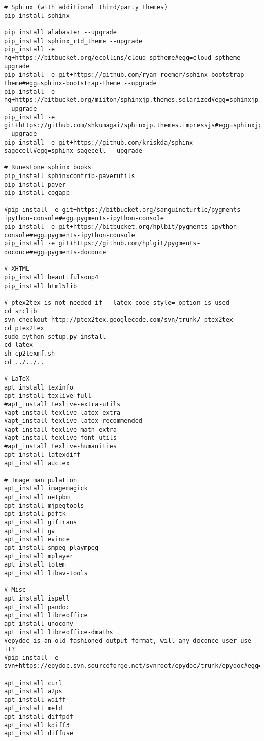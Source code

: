 \documentclass[%
oneside,                 %
final,                   %
chapterprefix=true,      %
open=right,              %
10pt]{book}
\begin{document}
\begin{verbatim}
# Sphinx (with additional third/party themes)
pip_install sphinx

pip_install alabaster --upgrade
pip_install sphinx_rtd_theme --upgrade
pip_install -e hg+https://bitbucket.org/ecollins/cloud_sptheme#egg=cloud_sptheme --upgrade
pip_install -e git+https://github.com/ryan-roemer/sphinx-bootstrap-theme#egg=sphinx-bootstrap-theme --upgrade
pip_install -e hg+https://bitbucket.org/miiton/sphinxjp.themes.solarized#egg=sphinxjp.themes.solarized --upgrade
pip_install -e git+https://github.com/shkumagai/sphinxjp.themes.impressjs#egg=sphinxjp.themes.impressjs --upgrade
pip_install -e git+https://github.com/kriskda/sphinx-sagecell#egg=sphinx-sagecell --upgrade

# Runestone sphinx books
pip_install sphinxcontrib-paverutils
pip_install paver
pip_install cogapp

#pip install -e git+https://bitbucket.org/sanguineturtle/pygments-ipython-console#egg=pygments-ipython-console
pip_install -e git+https://bitbucket.org/hplbit/pygments-ipython-console#egg=pygments-ipython-console
pip_install -e git+https://github.com/hplgit/pygments-doconce#egg=pygments-doconce

# XHTML
pip_install beautifulsoup4
pip_install html5lib

# ptex2tex is not needed if --latex_code_style= option is used
cd srclib
svn checkout http://ptex2tex.googlecode.com/svn/trunk/ ptex2tex
cd ptex2tex
sudo python setup.py install
cd latex
sh cp2texmf.sh
cd ../../..

# LaTeX
apt_install texinfo
apt_install texlive-full
#apt_install texlive-extra-utils
#apt_install texlive-latex-extra
#apt_install texlive-latex-recommended
#apt_install texlive-math-extra
#apt_install texlive-font-utils
#apt_install texlive-humanities
apt_install latexdiff
apt_install auctex

# Image manipulation
apt_install imagemagick
apt_install netpbm
apt_install mjpegtools
apt_install pdftk
apt_install giftrans
apt_install gv
apt_install evince
apt_install smpeg-plaympeg
apt_install mplayer
apt_install totem
apt_install libav-tools

# Misc
apt_install ispell
apt_install pandoc
apt_install libreoffice
apt_install unoconv
apt_install libreoffice-dmaths
#epydoc is an old-fashioned output format, will any doconce user use it?
#pip install -e svn+https://epydoc.svn.sourceforge.net/svnroot/epydoc/trunk/epydoc#egg=epydoc

apt_install curl
apt_install a2ps
apt_install wdiff
apt_install meld
apt_install diffpdf
apt_install kdiff3
apt_install diffuse


\end{verbatim}
\end{document}
